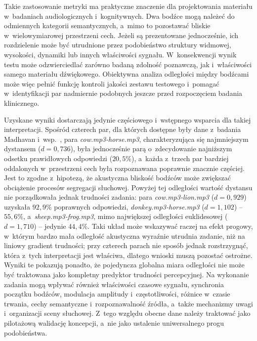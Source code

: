 \documentclass{article}
\begin{document}
Takie zastosowanie metryki ma praktyczne znaczenie dla projektowania materiału w~badaniach audiologicznych i~kognitywnych. Dwa bodźce mogą należeć do odmiennych kategorii semantycznych, a~mimo to pozostawać bliskie w~wielowymiarowej przestrzeni cech. Jeżeli są prezentowane jednocześnie, ich rozdzielenie może być utrudnione przez podobieństwo struktury widmowej, wysokości, dynamiki lub innych właściwości sygnału. W~konsekwencji wynik testu może odzwierciedlać zarówno badaną zdolność poznawczą, jak i~właściwości samego materiału dźwiękowego. Obiektywna analiza odległości między bodźcami może więc pełnić funkcję kontroli jakości zestawu testowego i~pomagać w~identyfikacji par nadmiernie podobnych jeszcze przed rozpoczęciem badania klinicznego.

Uzyskane wyniki dostarczają jedynie częściowego i~wstępnego wsparcia dla takiej interpretacji. Spośród czterech par, dla których dostępne były dane z~badania Madhavan i~wsp.~\cite{MadhavanWrobel2024MLT}, para \textit{cow.mp3-horse.mp3}, charakteryzująca się najmniejszym dystansem ($d = 0{,}736$), była jednocześnie parą o~zdecydowanie najniższym odsetku prawidłowych odpowiedzi ($20{,}5\%$), a~każda z~trzech par bardziej oddalonych w~przestrzeni cech była rozpoznawana poprawnie znacznie częściej. Jest to zgodne z~hipotezą, że akustyczna bliskość bodźców może zwiększać obciążenie procesów segregacji słuchowej. Powyżej tej odległości wartość dystansu nie porządkowała jednak trudności zadania: para \textit{cow.mp3-lion.mp3} ($d = 0{,}929$) uzyskała $92{,}9\%$ poprawnych odpowiedzi, \textit{donkey.mp3-horse.mp3} ($d = 1{,}102$) -- $55{,}6\%$, a~\textit{sheep.mp3-frog.mp3}, mimo największej odległości euklidesowej ($d = 1{,}710$) -- jedynie $44{,}4\%$. Taki układ może wskazywać raczej na efekt progowy, w~którym bardzo mała odległość akustyczna wyraźnie utrudnia zadanie, niż na liniowy gradient trudności; przy czterech parach nie sposób jednak rozstrzygnąć, która z~tych interpretacji jest właściwa, dlatego wnioski muszą pozostać ostrożne. Wyniki te pokazują ponadto, że pojedyncza globalna miara odległości nie może być traktowana jako kompletny predyktor trudności percepcyjnej. Na wykonanie zadania mogą wpływać również właściwości czasowe sygnału, synchronia początku bodźców, modulacja amplitudy i~częstotliwości, różnice w~czasie trwania, cechy semantyczne i~rozpoznawalność źródła, a~także mechanizmy uwagi i~organizacji sceny słuchowej. Z~tego względu obecne dane należy traktować jako pilotażową walidację koncepcji, a~nie jako ustalenie uniwersalnego progu podobieństwa.
\end{document}
